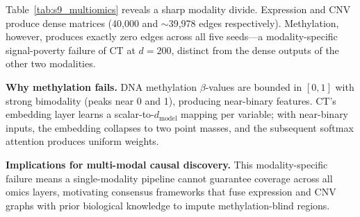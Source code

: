 \documentclass[12pt,a4paper]{article}
\begin{document}
Table~\ref{tab:s9_multiomics} reveals a sharp modality divide. Expression and CNV produce dense matrices (40,000 and $\sim$39,978 edges respectively). Methylation, however, produces exactly zero edges across all five seeds---a modality-specific signal-poverty failure of CT at $d=200$, distinct from the dense outputs of the other two modalities.

\textbf{Why methylation fails.} DNA methylation $\beta$-values are bounded in $[0,1]$ with strong bimodality (peaks near 0 and 1), producing near-binary features. CT's embedding layer learns a scalar-to-$d_{\text{model}}$ mapping per variable; with near-binary inputs, the embedding collapses to two point masses, and the subsequent softmax attention produces uniform weights.

\textbf{Implications for multi-modal causal discovery.} This modality-specific failure means a single-modality pipeline cannot guarantee coverage across all omics layers, motivating consensus frameworks that fuse expression and CNV graphs with prior biological knowledge to impute methylation-blind regions.



\end{document}
